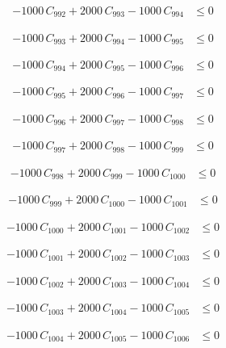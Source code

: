 \documentclass[a4paper,11pt]{article}
\begin{document}
\begin{align}
-1000\,C_{992} + 2000\,C_{993} - 1000\,C_{994} &\leq 0 \nonumber
\end{align}

\begin{align}
-1000\,C_{993} + 2000\,C_{994} - 1000\,C_{995} &\leq 0 \nonumber
\end{align}

\begin{align}
-1000\,C_{994} + 2000\,C_{995} - 1000\,C_{996} &\leq 0 \nonumber
\end{align}

\begin{align}
-1000\,C_{995} + 2000\,C_{996} - 1000\,C_{997} &\leq 0 \nonumber
\end{align}

\begin{align}
-1000\,C_{996} + 2000\,C_{997} - 1000\,C_{998} &\leq 0 \nonumber
\end{align}

\begin{align}
-1000\,C_{997} + 2000\,C_{998} - 1000\,C_{999} &\leq 0 \nonumber
\end{align}

\begin{align}
-1000\,C_{998} + 2000\,C_{999} - 1000\,C_{1000} &\leq 0 \nonumber
\end{align}

\begin{align}
-1000\,C_{999} + 2000\,C_{1000} - 1000\,C_{1001} &\leq 0 \nonumber
\end{align}

\begin{align}
-1000\,C_{1000} + 2000\,C_{1001} - 1000\,C_{1002} &\leq 0 \nonumber
\end{align}

\begin{align}
-1000\,C_{1001} + 2000\,C_{1002} - 1000\,C_{1003} &\leq 0 \nonumber
\end{align}

\begin{align}
-1000\,C_{1002} + 2000\,C_{1003} - 1000\,C_{1004} &\leq 0 \nonumber
\end{align}

\begin{align}
-1000\,C_{1003} + 2000\,C_{1004} - 1000\,C_{1005} &\leq 0 \nonumber
\end{align}

\begin{align}
-1000\,C_{1004} + 2000\,C_{1005} - 1000\,C_{1006} &\leq 0 \nonumber
\end{align}
\end{document}
